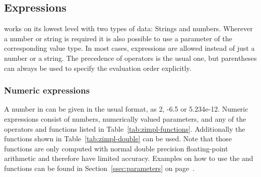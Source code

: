 \subsection{Expressions}
\zimpl works on its lowest level with two types of data: Strings and
numbers.
Wherever a number or string is required it is also possible to use a
parameter of the corresponding value type. In most cases, expressions are
allowed instead of just a number or a string.
The precedence of operators is the usual one, but
parentheses can always be used to specify the evaluation order explicitly.

\subsubsection{Numeric expressions}
A number in \zimpl can be given in the usual format, \eg as 2, -6.5 or 5.234e-12.
Numeric expressions consist of numbers, numerically valued parameters, and
any of the operators and functions listed in Table~\ref{tab:zimpl-functions}.
Additionally the functions shown in Table~\ref{tab:zimpl-double} can be
used. Note that those functions are only computed with normal double precision
floating-point arithmetic and therefore have limited
accuracy. Examples on how to use the  and 
functions can be found in Section~\ref{ssec:parameters} on page~\pageref{ssec:parameters}.

